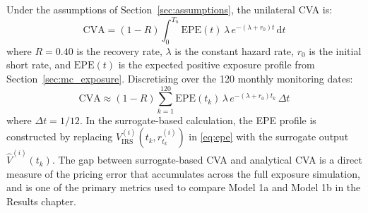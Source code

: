   Under the assumptions of Section~\ref{sec:assumptions}, the unilateral CVA is:
  \begin{equation}
  \mathrm{CVA}
    = (1 - R)\int_0^{T_n}
      \mathrm{EPE}(t)\,\lambda\,e^{-(\lambda + r_0)t}\,\mathrm{d}t
  \label{eq:cva}
  \end{equation}
  where $R = 0.40$ is the recovery rate, $\lambda$ is the constant hazard rate,
  $r_0$ is the initial short rate, and $\mathrm{EPE}(t)$ is the expected positive
  exposure profile from Section~\ref{sec:mc_exposure}. Discretising over the 120
  monthly monitoring dates:
  \begin{equation}
  \mathrm{CVA}
    \approx (1 - R)\sum_{k=1}^{120}
      \mathrm{EPE}(t_k)\,\lambda\,e^{-(\lambda + r_0)t_k}\,\Delta t
  \label{eq:cva_discrete}
  \end{equation}
  where $\Delta t = 1/12$. In the surrogate-based calculation, the EPE profile is
  constructed by replacing $V_{\mathrm{IRS}}^{(i)}(t_k, r_{t_k}^{(i)})$ in
  \eqref{eq:epe} with the surrogate output $\hat{V}^{(i)}(t_k)$. The gap between
  surrogate-based CVA and analytical CVA is a direct measure of the pricing error
  that accumulates across the full exposure simulation, and is one of the primary
  metrics used to compare Model 1a and Model 1b in the Results chapter.

